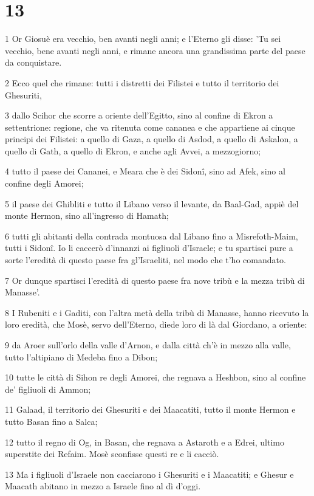 \chapter{13}

\par 1 Or Giosuè era vecchio, ben avanti negli anni; e l'Eterno gli disse: 'Tu sei vecchio, bene avanti negli anni, e rimane ancora una grandissima parte del paese da conquistare.
\par 2 Ecco quel che rimane: tutti i distretti dei Filistei e tutto il territorio dei Ghesuriti,
\par 3 dallo Scihor che scorre a oriente dell'Egitto, sino al confine di Ekron a settentrione: regione, che va ritenuta come cananea e che appartiene ai cinque principi dei Filistei: a quello di Gaza, a quello di Asdod, a quello di Askalon, a quello di Gath, a quello di Ekron, e anche agli Avvei, a mezzogiorno;
\par 4 tutto il paese dei Cananei, e Meara che è dei Sidonî, sino ad Afek, sino al confine degli Amorei;
\par 5 il paese dei Ghibliti e tutto il Libano verso il levante, da Baal-Gad, appiè del monte Hermon, sino all'ingresso di Hamath;
\par 6 tutti gli abitanti della contrada montuosa dal Libano fino a Misrefoth-Maim, tutti i Sidonî. Io li caccerò d'innanzi ai figliuoli d'Israele; e tu spartisci pure a sorte l'eredità di questo paese fra gl'Israeliti, nel modo che t'ho comandato.
\par 7 Or dunque spartisci l'eredità di questo paese fra nove tribù e la mezza tribù di Manasse'.
\par 8 I Rubeniti e i Gaditi, con l'altra metà della tribù di Manasse, hanno ricevuto la loro eredità, che Mosè, servo dell'Eterno, diede loro di là dal Giordano, a oriente:
\par 9 da Aroer sull'orlo della valle d'Arnon, e dalla città ch'è in mezzo alla valle, tutto l'altipiano di Medeba fino a Dibon;
\par 10 tutte le città di Sihon re degli Amorei, che regnava a Heshbon, sino al confine de' figliuoli di Ammon;
\par 11 Galaad, il territorio dei Ghesuriti e dei Maacatiti, tutto il monte Hermon e tutto Basan fino a Salca;
\par 12 tutto il regno di Og, in Basan, che regnava a Astaroth e a Edrei, ultimo superstite dei Refaim. Mosè sconfisse questi re e li cacciò.
\par 13 Ma i figliuoli d'Israele non cacciarono i Ghesuriti e i Maacatiti; e Ghesur e Maacath abitano in mezzo a Israele fino al dì d'oggi.
